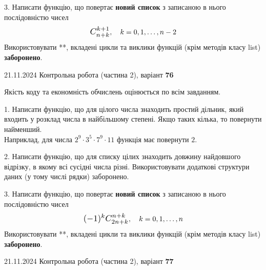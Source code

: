 \documentclass[12pt, ukrainian]{article}
\begin{document}
{{{{{{{{{{{{{{{{\begin {large}
3. 
Написати функцію, що повертає \textbf{новий список} з записаною в нього послідовністю чисел
$$\scalebox{1.2}{$C_{n+k}^{k+1}$}, \quad k=0,1,\ldots,n-2$$
Використовувати **, вкладені цикли та виклики функцій (крім методів класу list) \textbf{заборонено}.

\end{large}
\newpage
{{21.11.2024 Контрольна робота  (частина 2), варіант  \No \textbf { 76 }\par}}


{
\begin {large}
Якість коду та економність обчислень оцінюється по всім завданням.

\vspace{5mm}

1. Написати функцію, що для цілого числа знаходить простий дільник, який входить у розклад числа в найбільшому степені. Якщо таких кілька, то повернути найменший. \\ Наприклад, для числа $2^{9}{\cdot}3^5{\cdot}7^9{\cdot}11$ функція має повернути $2$.

\vspace{10mm}


2. Написати функцію, що для списку цілих знаходить довжину найдовшого відрізку, в якому всі сусідні числа різні. Використовувати додаткові структури даних (у тому числі рядки) заборонено.

\vspace{10mm}


3. 
Написати функцію, що повертає \textbf{новий список} з записаною в нього послідовністю чисел
$$\scalebox{1.2}{$(-1)^{k}C_{2n+k}^{n+k}$}, \quad k=0,1,\ldots,n$$
Використовувати **, вкладені цикли та виклики функцій (крім методів класу list) \textbf{заборонено}.

\end{large}
\vspace{25mm}


{{21.11.2024 Контрольна робота  (частина 2), варіант  \No \textbf { 77 }\par}}

}}}}}}}}}}}}}}}}}
\end{document}
